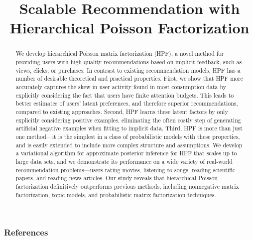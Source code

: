 \documentclass[]{article}
\title{Scalable Recommendation with Hierarchical Poisson Factorization}
\author{} %
\begin{document}
\maketitle

\begin{abstract}
We develop hierarchical Poisson matrix factorization (HPF), a novel
method for providing users with high quality recommendations based on
implicit feedback, such as views, clicks, or purchases.  In contrast
to existing recommendation models, HPF has a number of desirable
theoretical and practical properties.  First, we show that HPF more
accurately captures the skew in user activity found in most
consumption data by explicitly considering the fact that users have
finite attention budgets.  This leads to better estimates of users'
latent preferences, and therefore superior recommendations, compared
to existing approaches.  Second, HPF learns these latent factors by
only explicitly considering positive examples, eliminating the often
costly step of generating artificial negative examples when fitting to
implicit data.  Third, HPF is more than just one method---it is the
simplest in a class of probabilistic models with these properties, and
is easily extended to include more complex structure and assumptions.
We develop a variational algorithm for approximate posterior inference
for HPF that scales up to large data sets, and we demonstrate its
performance on a wide variety of real-world recommendation
problems---users rating movies, listening to songs, reading scientific
papers, and reading news articles.  Our study reveals that
hierarchical Poisson factorization definitively outperforms previous
methods, including nonnegative matrix factorization, topic models, and
probabilistic matrix factorization techniques.
\end{abstract}








\subsubsection*{References}

\small{



}
\end{document}
